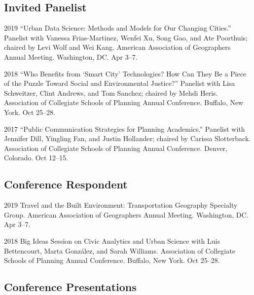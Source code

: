 \documentclass[12pt,letterpaper]{report}
\begin{document}
	\subsection*{Invited Panelist}

	\begin{tablist}

		\item[2019] \tab \enquote{Urban Data Science: Methods and Models for Our Changing Cities.} Panelist with Vanessa Frias-Martinez, Wenfei Xu, Song Gao, and Ate Poorthuis; chaired by Levi Wolf and Wei Kang. American Association of Geographers Annual Meeting. Washington, DC. Apr 3--7.

		\item[2018] \tab \enquote{Who Benefits from \enquote{Smart City} Technologies? How Can They Be a Piece of the Puzzle Toward Social and Environmental Justice?} Panelist with Lisa Schweitzer, Clint Andrews, and Tom Sanchez; chaired by Mehdi Heris. Association of Collegiate Schools of Planning Annual Conference. Buffalo, New York. Oct 25--28.

		\item[2017] \tab \enquote{Public Communication Strategies for Planning Academics.} Panelist with Jennifer Dill, Yingling Fan, and Justin Hollander; chaired by Carissa Slotterback. Association of Collegiate Schools of Planning Annual Conference. Denver, Colorado. Oct 12--15.

	\end{tablist}

	\subsection*{Conference Respondent}

	\begin{tablist}

		\item[2019] \tab Travel and the Built Environment: Transportation Geography Specialty Group. American Association of Geographers Annual Meeting. Washington, DC. Apr 3--7.

		\item[2018] \tab Big Ideas Session on Civic Analytics and Urban Science with Luis Bettencourt, Marta González, and Sarah Williams. Association of Collegiate Schools of Planning Annual Conference. Buffalo, New York. Oct 25--28.

	\end{tablist}

	\subsection*{Conference Presentations}
\end{document}
